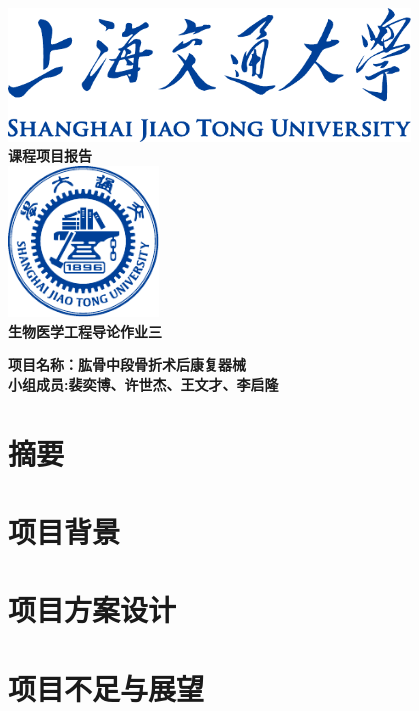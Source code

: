 \documentclass[UTF8]{ctexart}
\begin{document}
\pagestyle{fancy}

\begin{titlepage}
    \begin{center}
        \includegraphics[width=0.8\textwidth]{sjtu-name-blue.pdf}\\[1cm]
        \textsc{\huge \bfseries 课程项目报告}\\[1.5cm]
        \includegraphics[width=0.3\textwidth]{sjtu-badge-blue.pdf}\\[1cm]    
        \textsc{\huge \bfseries 生物医学工程导论作业三}\\[1.5cm]

        \begin{minipage}{0.75\textwidth}
            \begin{flushleft} 
                \LARGE \bfseries{项目名称：肱骨中段骨折术后康复器械}\\
                \LARGE \bfseries{小组成员:裴奕博、许世杰、王文才、李启隆}
            \end{flushleft}
        \end{minipage}

    \end{center}
\end{titlepage}


\section{摘要}

\section{项目背景}
    
\section{项目方案设计}

\section{项目不足与展望}
    
\end{document}
